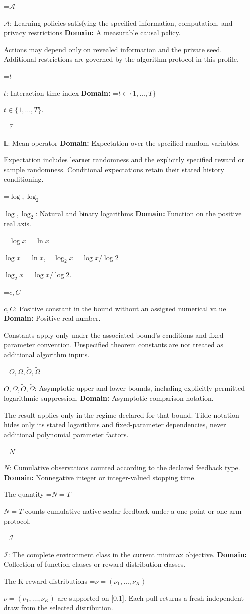 \documentclass[10pt,a4paper]{article}
\newcommand{\AtlasMath}[1]{\par\begingroup\centering\setbox0=\hbox{$\displaystyle #1$}\ifdim\wd0>1.4\linewidth\typeout{ATLAS WIDE FORMULA: \the\wd0}\fi\ifdim\wd0>\linewidth\resizebox{\linewidth}{!}{\box0}\else\box0\fi\par\endgroup}
\newcommand{\AtlasInlineMath}[1]{\begingroup\setbox0=\hbox{$#1$}\ifdim\wd0>.4\linewidth\endgroup\AtlasMath{#1}\else\endgroup$#1$\fi}
\begin{document}
\AtlasInlineMath{\mathcal A}: Learning policies satisfying the specified information, computation, and privacy restrictions \textbf{Domain:} A measurable causal policy.

Actions may depend only on revealed information and the private seed. Additional restrictions are governed by the algorithm protocol in this profile.

\AtlasInlineMath{t}: Interaction-time index \textbf{Domain:} \AtlasInlineMath{t\in\{1,\ldots,T\}}.

\AtlasInlineMath{\mathbb E}: Mean operator \textbf{Domain:} Expectation over the specified random variables.

Expectation includes learner randomness and the explicitly specified reward or sample randomness. Conditional expectations retain their stated history conditioning.

\AtlasInlineMath{\log,\log_2}: Natural and binary logarithms \textbf{Domain:} Function on the positive real axis.

\AtlasInlineMath{\log x=\ln x}, \AtlasInlineMath{\log_2x=\log x/\log2}.

\AtlasInlineMath{c,C}: Positive constant in the bound without an assigned numerical value \textbf{Domain:} Positive real number.

Constants apply only under the associated bound’s conditions and fixed-parameter convention. Unspecified theorem constants are not treated as additional algorithm inputs.

\AtlasInlineMath{O,\Omega,\widetilde O,\widetilde\Omega}: Asymptotic upper and lower bounds, including explicitly permitted logarithmic suppression. \textbf{Domain:} Asymptotic comparison notation.

The result applies only in the regime declared for that bound. Tilde notation hides only its stated logarithms and fixed-parameter dependencies, never additional polynomial parameter factors.

\AtlasInlineMath{N}: Cumulative observations counted according to the declared feedback type. \textbf{Domain:} Nonnegative integer or integer-valued stopping time.

The quantity \AtlasInlineMath{N=T} counts cumulative native scalar feedback under a one-point or one-arm protocol.

\AtlasInlineMath{\mathcal I}: The complete environment class in the current minimax objective. \textbf{Domain:} Collection of function classes or reward-distribution classes.

The K reward distributions \AtlasInlineMath{\nu=(\nu_1,\ldots,\nu_K)} are supported on [0,1]. Each pull returns a fresh independent draw from the selected distribution.
\end{document}
